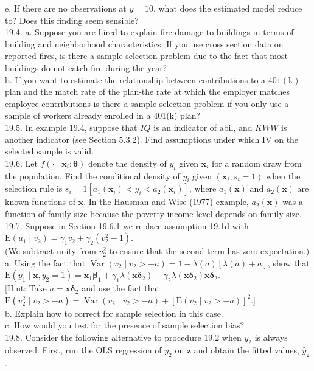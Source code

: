 \documentclass[10pt]{article}
\begin{document}
e. If there are no observations at $y=10$, what does the estimated model reduce to? Does this finding seem sensible?\\
19.4. a. Suppose you are hired to explain fire damage to buildings in terms of building and neighborhood characteristics. If you use cross section data on reported fires, is there a sample selection problem due to the fact that most buildings do not catch fire during the year?\\
b. If you want to estimate the relationship between contributions to a $401(\mathrm{k})$ plan and the match rate of the plan-the rate at which the employer matches employee contributions-is there a sample selection problem if you only use a sample of workers already enrolled in a 401(k) plan?\\
19.5. In example 19.4, suppose that $I Q$ is an indicator of abil, and $K W W$ is another indicator (see Section 5.3.2). Find assumptions under which IV on the selected sample is valid.\\
19.6. Let $f\left(\cdot \mid \mathbf{x}_{i} ; \boldsymbol{\theta}\right)$ denote the density of $y_{i}$ given $\mathbf{x}_{i}$ for a random draw from the population. Find the conditional density of $y_{i}$ given $\left(\mathbf{x}_{i}, s_{i}=1\right)$ when the selection rule is $s_{i}=1\left[a_{1}\left(\mathbf{x}_{i}\right)<y_{i}<a_{2}\left(\mathbf{x}_{i}\right)\right]$, where $a_{1}(\mathbf{x})$ and $a_{2}(\mathbf{x})$ are known functions of $\mathbf{x}$. In the Hausman and Wise (1977) example, $a_{2}(\mathbf{x})$ was a function of family size because the poverty income level depends on family size.\\
19.7. Suppose in Section 19.6.1 we replace assumption 19.1d with\\
$\mathrm{E}\left(u_{1} \mid v_{2}\right)=\gamma_{1} v_{2}+\gamma_{2}\left(v_{2}^{2}-1\right)$.\\
(We subtract unity from $v_{2}^{2}$ to ensure that the second term has zero expectation.)\\
a. Using the fact that $\operatorname{Var}\left(v_{2} \mid v_{2}>-a\right)=1-\lambda(a)[\lambda(a)+a]$, show that\\
$\mathrm{E}\left(y_{1} \mid \mathbf{x}, y_{2}=1\right)=\mathbf{x}_{1} \boldsymbol{\beta}_{1}+\gamma_{1} \lambda\left(\mathbf{x} \boldsymbol{\delta}_{2}\right)-\gamma_{2} \lambda\left(\mathbf{x} \boldsymbol{\delta}_{2}\right) \mathbf{x} \boldsymbol{\delta}_{2}$.\\[0pt]
[Hint: Take $a=\mathbf{x} \boldsymbol{\delta}_{2}$ and use the fact that $\mathrm{E}\left(v_{2}^{2} \mid v_{2}>-a\right)=\operatorname{Var}\left(v_{2} \mid v_{2}>-a\right)+ \left[\mathrm{E}\left(v_{2} \mid v_{2}>-a\right)\right]^{2}$.]\\
b. Explain how to correct for sample selection in this case.\\
c. How would you test for the presence of sample selection bias?\\
19.8. Consider the following alternative to procedure 19.2 when $y_{2}$ is always observed. First, run the OLS regression of $y_{2}$ on $\mathbf{z}$ and obtain the fitted values, $\hat{y}_{2}$.
\end{document}
